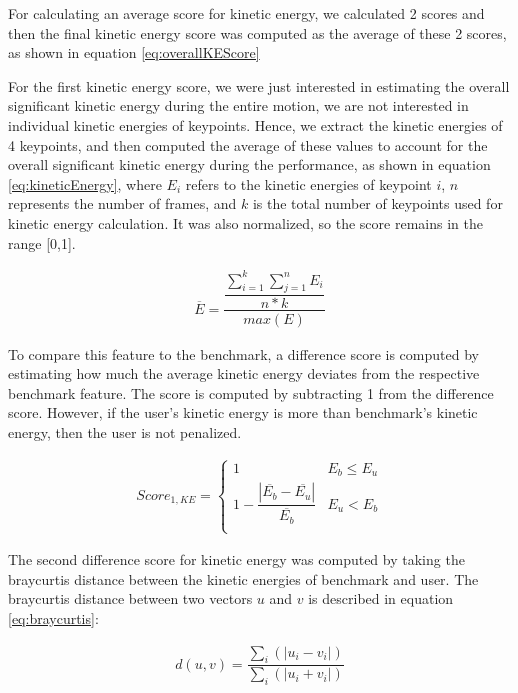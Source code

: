 For calculating an average score for kinetic energy, we calculated 2 scores and then the final kinetic energy score was computed as the average of these 2 scores, as shown in equation \ref{eq:overallKEScore}

For the first kinetic energy score, we were just interested in estimating the overall significant kinetic energy during the entire motion, we are not interested in individual kinetic energies of keypoints. Hence, we extract the kinetic energies of 4 keypoints, and then computed the average of these values to account for the overall significant kinetic energy during the performance, as shown in equation \ref{eq:kineticEnergy}, where $E_i$ refers to the kinetic energies of keypoint $i$, $n$ represents the number of frames, and $k$ is the total number of keypoints used for kinetic energy calculation. It was also normalized, so the score remains in the range [0,1].

\begin{gather}
  \overline{E} = \dfrac{\dfrac{\sum_{i=1}^k \sum_{j=1}^n E_i}{n * k}}{max(E)} 
  \label{eq:kineticEnergy}
\end{gather}

To compare this feature to the benchmark, a difference score is computed by estimating how much the average kinetic energy deviates from the respective benchmark feature. The score is computed by subtracting 1 from the difference score. However, if the user's kinetic energy is more than benchmark's kinetic energy, then the user is not penalized. 

\begin{gather}
  Score_{1,KE} = 
  \begin{cases}
    1 & E_b \leq E_u \\
    1 - \dfrac{|\overline{E_b} - \overline{E_u}|} { \overline{E_b}} & E_u < E_b \\
\end{cases}
  \label{eq:KEScore}
\end{gather}

The second difference score for kinetic energy was computed by taking the braycurtis distance between the kinetic energies of benchmark and user. The braycurtis distance between two vectors $u$ and $v$ is described in equation \ref{eq:braycurtis}:

\begin{align}
  d(u,v) = \dfrac{\sum_i (|u_i - v_i|)}{\sum_i (|u_i + v_i|)}
  \label{eq:braycurtis}
\end{align}

